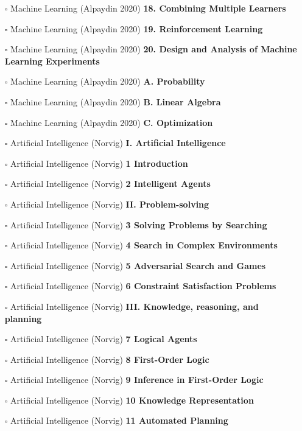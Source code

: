 \documentclass[a4, landscape, 12pt]{article}
\newcommand{\checkbox}{$\square$}%
\begin{document}
\begin{itemize}
{}
\item [\checkbox]  Machine Learning (Alpaydin 2020) \textbf{ 18. Combining Multiple Learners
}
\item [\checkbox]  Machine Learning (Alpaydin 2020) \textbf{ 19. Reinforcement Learning
}
\item [\checkbox]  Machine Learning (Alpaydin 2020) \textbf{ 20. Design and Analysis of Machine Learning Experiments
}
\item [\checkbox]  Machine Learning (Alpaydin 2020) \textbf{ A. Probability
}
\item [\checkbox]  Machine Learning (Alpaydin 2020) \textbf{ B. Linear Algebra
}
\item [\checkbox]  Machine Learning (Alpaydin 2020) \textbf{ C. Optimization
}
\item [\checkbox]  Artificial Intelligence (Norvig) \textbf{ I. Artificial Intelligence
}
\item [\checkbox]  Artificial Intelligence (Norvig) \textbf{ 1 Introduction
}
\item [\checkbox]  Artificial Intelligence (Norvig) \textbf{ 2 Intelligent Agents
}
\item [\checkbox]  Artificial Intelligence (Norvig) \textbf{ II. Problem-solving
}
\item [\checkbox]  Artificial Intelligence (Norvig) \textbf{ 3 Solving Problems by Searching
}
\item [\checkbox]  Artificial Intelligence (Norvig) \textbf{ 4 Search in Complex Environments
}
\item [\checkbox]  Artificial Intelligence (Norvig) \textbf{ 5 Adversarial Search and Games
}
\item [\checkbox]  Artificial Intelligence (Norvig) \textbf{ 6 Constraint Satisfaction Problems
}
\item [\checkbox]  Artificial Intelligence (Norvig) \textbf{ III. Knowledge, reasoning, and planning
}
\item [\checkbox]  Artificial Intelligence (Norvig) \textbf{ 7 Logical Agents
}
\item [\checkbox]  Artificial Intelligence (Norvig) \textbf{ 8 First-Order Logic
}
\item [\checkbox]  Artificial Intelligence (Norvig) \textbf{ 9 Inference in First-Order Logic
}
\item [\checkbox]  Artificial Intelligence (Norvig) \textbf{ 10 Knowledge Representation
}
\item [\checkbox]  Artificial Intelligence (Norvig) \textbf{ 11 Automated Planning
}

\end{itemize}
\end{document}
